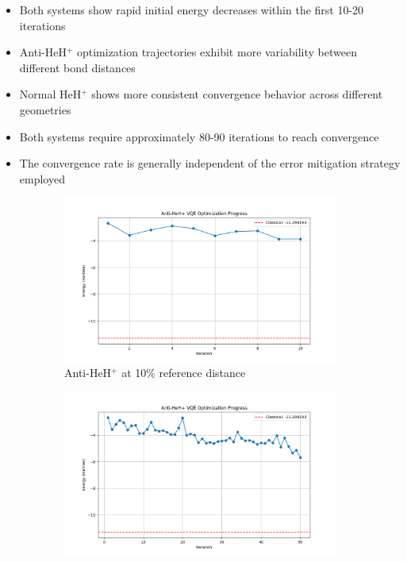 \documentclass[10pt,twocolumn,a4paper]{article}
\begin{document}
\begin{itemize}
    \item Both systems show rapid initial energy decreases within the first 10-20 iterations
    \item Anti-HeH$^+$ optimization trajectories exhibit more variability between different bond distances
    \item Normal HeH$^+$ shows more consistent convergence behavior across different geometries
    \item Both systems require approximately 80-90 iterations to reach convergence
    \item The convergence rate is generally independent of the error mitigation strategy employed
\end{itemize}

\begin{figure}[t!]
    \centering
    \begin{subfigure}[b]{0.32\textwidth}
        \includegraphics[width=\textwidth]{graphs/vqe_progress_anti_heh+_10.png}
        \caption{Anti-HeH$^+$ at 10\% reference distance}
        \label{fig:vqe_progress_anti_10}
    \end{subfigure}
    \hfill
    \begin{subfigure}[b]{0.32\textwidth}
        \includegraphics[width=\textwidth]{graphs/vqe_progress_anti_heh+_50.png}

\end{subfigure}
\end{figure}
\end{document}
